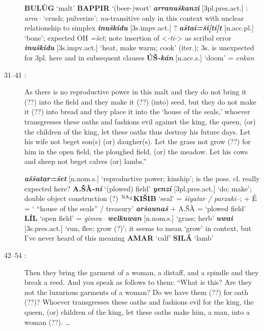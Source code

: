 \documentclass[10pt]{article}
\newcommand{\supersc}[1]{$^{\textrm{\scriptsize{#1}}}$}  	%
\newcommand{\subsc}[1]{$_{\textrm{\scriptsize{#1}}}$}	%
\newcommand{\bit}[1]{\textbf{\textit{#1}}}				%
\newcommand{\p}[1]{{\tiny[{#1}]}}					%
\newcommand{\hith}{\textsubwedge{h}}
\newcommand{\stone}{\supersc{NA\subsc{4}}}
\renewcommand{\.}[1]{\textsubdot{#1}}
\begin{document}
\begin{description}
\begin{notes}

\textbf{BUL\`UG} `malt' \textbf{BAPPIR} `(beer-)wort' \bit{{\hith}arranu\v{s}kanzi} \p{3pl.pres.act.} : \textit{{\hith}arra--} `crush; pulverize'; \textit{nu}-transitive only in this context with unclear relationship to simplex \bit{inu\v{s}kidu} \p{3s.impv.act.} ? \bit{{\hith}a\v{s}tai=\v{s}i[ti]t} \p{n.acc.pl.} `bone'; expected OH \textit{=\v{s}et}; note insertion of <\textit{-ti-}> as scribal error \bit{inu\v{s}kidu} \p{3s.impv.act.} `heat, make warm; cook' (iter.); 3s. is unexpected for 3pl. here and in subsequent clauses \textbf{\'U\v{S}}\bit{-k\'an} \p{n.acc.s.} `doom' = \textit{{\hith}enkan}

\end{notes}


\item[31--41 :] As there is no reproductive power in this malt and they do not bring it (??) into the field and they make it (??) (into) seed, but they do not make it (??) into bread and they place it into the `house of the seals,' whoever transgresses these oaths and fashions evil against the king, the queen, (or) the children of the king, let these oaths thus destroy his future days. Let his wife not beget son(s) (or) daugher(s). Let the grass not grow (??) for him in the open field, the ploughed field, (or) the meadow. Let his cows and sheep not beget calves (or) lambs.''



\begin{notes}

\bit{{\hith}a\v{s}\v{s}atar=\v{s}et} \p{n.nom.s.} `reproductive power; kinship'; is the poss. cl. really expected here? \textbf{A.\v{S}\`A}\bit{-ni} `(plowed) field' \bit{yenzi} \p{3pl.pres.act.} `do; make'; double object construction (?) \textbf{{\stone}KI\v{S}IB} `seal' = \textit{\v{s}iyatar / parzaki--}; + \'E = ` ``house of the seals'' / treasury' \bit{{\hith}ar\v{s}auna\v{s}} + A.\v{S}\`A = `plowed field' \textbf{L\'IL} `open field' = \textit{gimra--} \bit{welkuwan} \p{n.nom.s.} `grass; herb' \bit{{\hith}uwai} \p{3s.pres.act.} `run, flee; grow (?)'; it seems to mean `grow' in context, but I've never heard of this meaning \textbf{AMAR} `calf' \textbf{SIL\'A} `lamb'

\end{notes}


\item[42--54 :] Then they bring the garment of a woman, a distaff, and a spindle and they break a reed. And you speak as follows to them: ``What is this? Are they not the luxurious garments of a woman? Do we have them (??) for oath (??)? Whoever transgresses these oaths and fashions evil for the king, the queen, (or) children of the king, let these oaths make him, a man, into a woman (??). {\ldots}




\end{description}
\end{document}
